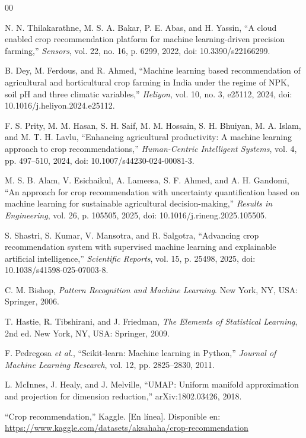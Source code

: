 \documentclass[conference]{IEEEtran}
\begin{document}
\begin{thebibliography}{00}

N. N. Thilakarathne, M. S. A. Bakar, P. E. Abas, and H. Yassin,
``A cloud enabled crop recommendation platform for machine learning-driven precision farming,''
\textit{Sensors}, vol. 22, no. 16, p. 6299, 2022,
doi: 10.3390/s22166299.

B. Dey, M. Ferdous, and R. Ahmed,
``Machine learning based recommendation of agricultural and horticultural crop farming in India under the regime of NPK, soil pH and three climatic variables,''
\textit{Heliyon}, vol. 10, no. 3, e25112, 2024,
doi: 10.1016/j.heliyon.2024.e25112.

F. S. Prity, M. M. Hasan, S. H. Saif, M. M. Hossain, S. H. Bhuiyan, M. A. Islam, and M. T. H. Lavlu,
``Enhancing agricultural productivity: A machine learning approach to crop recommendations,''
\textit{Human-Centric Intelligent Systems}, vol. 4, pp. 497--510, 2024,
doi: 10.1007/s44230-024-00081-3.

M. S. B. Alam, V. Esichaikul, A. Lameesa, S. F. Ahmed, and A. H. Gandomi,
``An approach for crop recommendation with uncertainty quantification based on machine learning for sustainable agricultural decision-making,''
\textit{Results in Engineering}, vol. 26, p. 105505, 2025,
doi: 10.1016/j.rineng.2025.105505.

S. Shastri, S. Kumar, V. Mansotra, and R. Salgotra,
``Advancing crop recommendation system with supervised machine learning and explainable artificial intelligence,''
\textit{Scientific Reports}, vol. 15, p. 25498, 2025,
doi: 10.1038/s41598-025-07003-8.

C. M. Bishop,
\textit{Pattern Recognition and Machine Learning}.
New York, NY, USA: Springer, 2006.

T. Hastie, R. Tibshirani, and J. Friedman,
\textit{The Elements of Statistical Learning}, 2nd ed.
New York, NY, USA: Springer, 2009.

F. Pedregosa \textit{et al.},
``Scikit-learn: Machine learning in Python,''
\textit{Journal of Machine Learning Research},
vol. 12, pp. 2825--2830, 2011.

L. McInnes, J. Healy, and J. Melville,
``UMAP: Uniform manifold approximation and projection for dimension reduction,''
arXiv:1802.03426, 2018.

``Crop recommendation,'' Kaggle. [En línea]. Disponible en: \url{https://www.kaggle.com/datasets/aksahaha/crop-recommendation}

\end{thebibliography}
\end{document}

